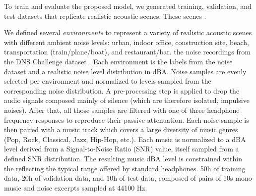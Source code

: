 To train and evaluate the proposed model, we generated training, validation, and test datasets that replicate realistic acoustic scenes. These scenes .  

We defined several \textit{environments} to represent a variety of realistic acoustic scenes with different ambient noise levels: urban, indoor office, construction site, beach, transportation (train/plane/boat), and restaurant/bar. 
 the noise recordings from the DNS Challenge dataset \cite{dubeyIcassp2022Deep2022}.
Each environment is  the labels from the noise dataset and a realistic noise level distribution in dBA. Noise samples are evenly selected per environment and normalized to levels sampled from the corresponding noise distribution. A pre-processing step is applied to drop the audio signals composed mainly of silence (which are therefore isolated, impulsive noises). After that, all those samples are filtered with one of three headphone frequency responses to reproduce their passive attenuation. 
Each noise sample is then paired with a music track  which covers a large diversity of music genres (Pop, Rock, Classical, Jazz, Hip-Hop, etc.).
Each music is normalized to a dBA level derived from a Signal-to-Noise Ratio (SNR) value, itself sampled from a defined SNR distribution. The resulting music dBA level is constrained within the  reflecting the typical range offered by standard headphones.
 50h of training data, 20h of validation data, and 10h of test data, composed of pairs of 10s mono music and noise excerpts sampled at 44100 Hz.